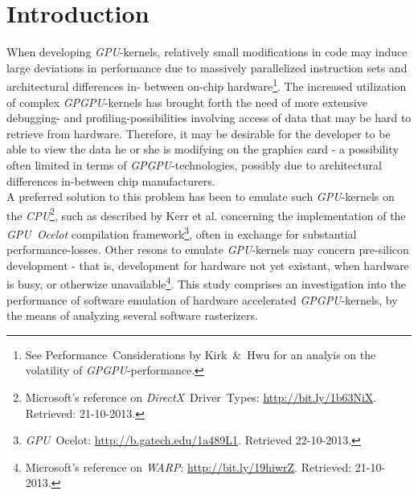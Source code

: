 \documentclass[fleqn,10pt]{SelfArx} %
\affiliation{EricNNilsson@gmail.com}
\newlength{\tocsep}
\begin{document}
\flushbottom %
\maketitle %
\thispagestyle{empty} %

\section*{Introduction} %
\label{sec:introduction}
When developing \textit{GPU}-kernels, relatively small modifications in code may induce large deviations in performance due to massively parallelized instruction sets and architectural differences in-
between on-chip hardware\footnote{See Performance~Considerations by Kirk~\&~Hwu\cite[ch.~6]{Kirk:2010:PMP:1841511} for an analyis on the volatility of \textit{GPGPU}-performance.}. The increased utilization of complex \textit{GPGPU}-kernels has brought forth the need of more extensive debugging- and profiling-possibilities involving access of data that may be hard to retrieve from hardware. Therefore, it may be desirable for the developer to be able to view the data he or she is modifying on the graphics card - a possibility often limited in terms of \textit{GPGPU}-technologies, possibly due to architectural differences in-between chip manufacturers.\\
A preferred solution to this problem has been to emulate such \textit{GPU}-kernels on the \textit{CPU}\footnote{\label{ftn:drivertypes}Microsoft's reference on \textit{DirectX}~Driver~Types: \url{http://bit.ly/1b63NiX}. Retrieved: 21-10-2013.}, such as described by Kerr et al.\cite[p.~416-419]{Hwu:2011:GCG:2103614} concerning the implementation of the \textit{GPU~Ocelot} compilation framework\footnote{\label{ftn:ocelot}\textit{GPU}~Ocelot: \url{http://b.gatech.edu/1a489L1}. Retrieved 22-10-2013.}, often in exchange for substantial performance-losses. Other resons to emulate \textit{GPU}-kernels may concern pre-silicon development - that is, development for hardware not yet existant, when hardware is busy, or otherwize unavailable\footnote{\label{ftn:warpguide}Microsoft's reference on \textit{WARP}: \url{http://bit.ly/19hiwrZ}. Retrieved: 21-10-2013.}. This study comprises an investigation into the performance of software emulation of hardware accelerated \textit{GPGPU}-kernels, by the means of analyzing several software rasterizers.\\
\end{document}
